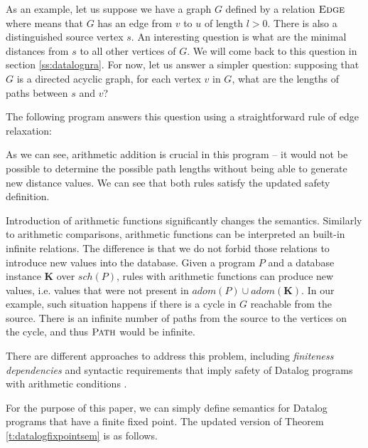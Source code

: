 \begin{exmp}

As an example, let us suppose we have a graph $G$ defined by a relation $\textsc{Edge}$ 
where  means that $G$ has an edge from $v$ to $u$ of length $l > 0$. 
There is also a distinguished source vertex $s$.
An interesting question is what are the minimal distances from $s$ to all other vertices of $G$.
We will come back to this question in section \ref{ss:datalognra}.
For now, let us answer a simpler question: supposing that $G$ is a directed acyclic graph, for each vertex $v$ in $G$,
what are the lengths of paths between $s$ and $v$?

The following program answers this question using a straightforward rule of edge relaxation:


As we can see, arithmetic addition is crucial in this program -- it would not be possible to determine the possible path lengths without being able to generate new distance values. We can see that both rules satisfy the updated safety definition.
\end{exmp}

Introduction of arithmetic functions significantly changes the semantics.
Similarly to arithmetic comparisons, arithmetic functions can be interpreted an built-in infinite relations. 
The difference is that we do not forbid those relations to introduce new values into the database.
Given a program $P$ and a database instance $\textbf{K}$ over $sch(P)$, rules with arithmetic functions can produce new values, i.e. values that were not present in $adom(P) \cup adom(\textbf{K})$. In our example, such situation happens if there is a cycle in $G$ reachable from the source. There is an infinite number of paths from the source to the vertices on the cycle, and thus $\textsc{Path}$ would be infinite.

There are different approaches to address this problem, including \emph{finiteness dependencies} and syntactic requirements that imply safety of Datalog programs with arithmetic conditions \cite{RBS87, KRS88a, KRS88b, SV89}.

For the purpose of this paper, we can simply define semantics for Datalog programs that have a finite fixed point. The updated version of Theorem \ref{t:datalogfixpointsem} is as follows.

